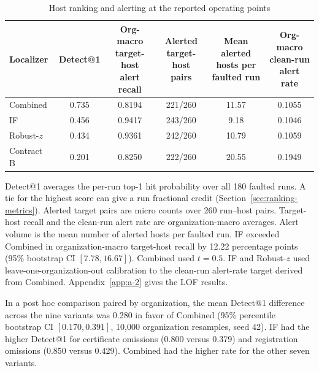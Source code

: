 \documentclass[sn-basic]{sn-jnl}%
\theoremstyle{thmstyleone}%
\theoremstyle{thmstyletwo}%
\theoremstyle{thmstylethree}%
\begin{document}
\begin{table}[htbp]
\centering
\caption{Host ranking and alerting at the reported operating points}
\label{tab:host-ranking-alerting}
\small
\setlength{\tabcolsep}{2pt}
\renewcommand{\arraystretch}{1.1}
\begin{tabular*}{\linewidth}{@{\extracolsep{\fill}}lccccc@{}}
\toprule
Localizer &
Detect@1 &
\shortstack{Org-macro\\target-host\\alert recall} &
\shortstack{Alerted\\target-host\\pairs} &
\shortstack{Mean alerted\\hosts per\\faulted run} &
\shortstack{Org-macro\\clean-run\\alert rate} \\
\midrule
Combined    & 0.735 & 0.8194 & 221/260 & 11.57 & 0.1055 \\
IF          & 0.456 & 0.9417 & 243/260 &  9.18 & 0.1046 \\
Robust-\(z\) & 0.434 & 0.9361 & 242/260 & 10.79 & 0.1059 \\
Contract B  & 0.201 & 0.8250 & 222/260 & 20.55 & 0.1949 \\
\bottomrule
\end{tabular*}
\end{table}

Detect@1 averages the per-run top-1 hit probability over all 180 faulted runs. A tie for the highest score can give a run fractional credit (Section~\ref{sec:ranking-metrics}). Alerted target pairs are micro counts over 260 run--host pairs. Target-host recall and the clean-run alert rate are organization-macro averages. Alert volume is the mean number of alerted hosts per faulted run. IF exceeded Combined in organization-macro target-host recall by 12.22 percentage points (95\% bootstrap CI \([7.78, 16.67]\)). Combined used \(t=0.5\). IF and Robust-\(z\) used leave-one-organization-out calibration to the clean-run alert-rate target derived from Combined. Appendix~\ref{app:a-2} gives the LOF results.

In a post hoc comparison paired by organization, the mean Detect@1 difference across the nine variants was 0.280 in favor of Combined (95\% percentile bootstrap CI \([0.170, 0.391]\), 10,000 organization resamples, seed 42). IF had the higher Detect@1 for certificate omissions (0.800 versus 0.379) and registration omissions (0.850 versus 0.429). Combined had the higher rate for the other seven variants.
\end{document}
